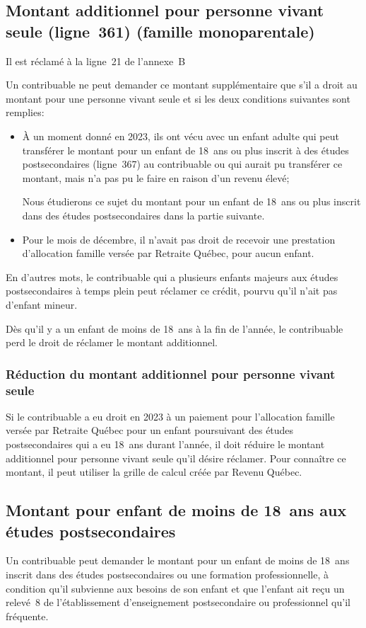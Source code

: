 \subsection{Montant additionnel pour personne vivant seule (ligne~361) (famille monoparentale)}
Il est réclamé à la ligne~21 de l'annexe~B

Un contribuable ne peut demander ce montant supplémentaire que s'il a droit au montant pour une personne vivant seule et si les deux conditions suivantes sont remplies:
\begin{itemize}
	\item À un moment donné en 2023, ils ont vécu avec un enfant adulte qui peut transférer le montant pour un enfant de 18~ans ou plus inscrit à des études postsecondaires (ligne~367) au contribuable ou qui aurait pu transférer ce montant, mais n'a pas pu le faire en raison d'un revenu élevé;
	\begin{note}
		Nous étudierons ce sujet du montant pour un enfant de 18~ans ou plus inscrit dans des études postsecondaires dans la partie suivante.
	\end{note}
	\item Pour le mois de décembre, il n'avait pas droit de recevoir une prestation d'allocation famille versée par Retraite Québec, pour aucun enfant.
\end{itemize}

En d'autres mots, le contribuable qui a plusieurs enfants majeurs aux études postsecondaires à temps plein peut réclamer ce crédit, pourvu qu'il n'ait pas d'enfant mineur.

Dès qu'il y a un enfant de moins de 18~ans à la fin de l'année, le contribuable perd le droit de réclamer le montant additionnel.

\subsubsection{Réduction du montant additionnel pour personne vivant seule}
Si le contribuable a eu droit en 2023 à un paiement pour l'allocation famille versée par Retraite Québec pour un enfant poursuivant des études postsecondaires qui a eu 18~ans durant l'année, il doit réduire le montant additionnel pour personne vivant seule qu'il désire réclamer. Pour connaître ce montant, il peut utiliser la grille de calcul créée par Revenu Québec.


\subsection{Montant pour enfant de moins de 18~ans aux études postsecondaires}
Un contribuable peut demander le montant pour un enfant de moins de 18~ans inscrit dans des études postsecondaires ou une formation professionnelle, à condition qu'il subvienne aux besoins de son enfant et que l'enfant ait reçu un relevé~8 de l'établissement d'enseignement postsecondaire ou professionnel qu'il fréquente. 

